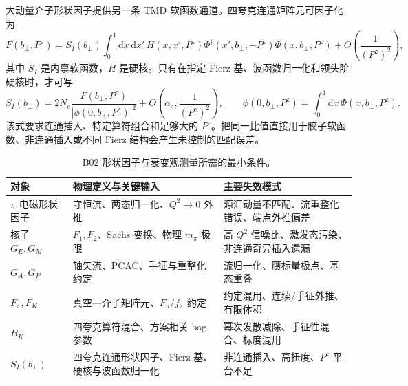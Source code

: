 大动量介子形状因子提供另一条 TMD 软函数通道。四夸克连通矩阵元可因子化为
\begin{equation}
  F(b_\perp,P^z)
  =S_I(b_\perp)
  \int_0^1\!\mathrm dx\,\mathrm dx'\,
  H(x,x',P^z)
  \Phi^\dagger(x',b_\perp,-P^z)
  \Phi(x,b_\perp,P^z)
  +O\!\left(\frac1{(P^z)^2}\right),
  \label{eq:b02-soft-factorization}
\end{equation}
其中 \(S_I\) 是内禀软函数，\(H\) 是硬核。只有在指定 Fierz 基、波函数归一化和领头阶硬核时，才可写
\begin{equation}
  S_I(b_\perp)
  =2N_c\frac{F(b_\perp,P^z)}
  {\left|\phi(0,b_\perp,P^z)\right|^2}
  +O\!\left(\alpha_s,\frac1{(P^z)^2}\right),
  \qquad
  \phi(0,b_\perp,P^z)=\int_0^1\!\mathrm dx\,\Phi(x,b_\perp,P^z).
  \label{eq:b02-soft-lo}
\end{equation}
该式要求连通插入、特定算符组合和足够大的 \(P^z\)。把同一比值直接用于胶子软函数、非连通插入或不同 Fierz 结构会产生未控制的匹配误差。

\begin{table}[htbp]
\centering
\small
\caption{B02 形状因子与衰变观测量所需的最小条件。}
\label{tab:b02-form-factor-conditions}
\begin{tabularx}{\textwidth}{>{\raggedright\arraybackslash}p{2.7cm}>{\raggedright\arraybackslash}X>{\raggedright\arraybackslash}p{3.7cm}}
\toprule
对象 & 物理定义与关键输入 & 主要失效模式 \\
\midrule
\(\pi\) 电磁形状因子 & 守恒流、两态归一化、\(Q^2\to0\) 外推 & 源汇动量不匹配、流重整化错误、端点外推偏差 \\
核子 \(G_E,G_M\) & \(F_1,F_2\)、Sachs 变换、物理 \(m_\pi\) 极限 & 高 \(Q^2\) 信噪比、激发态污染、非连通奇异插入遗漏 \\
\(G_A,G_P\) & 轴矢流、PCAC、手征与重整化约定 & 流归一化、赝标量极点、基态重叠 \\
\(F_\pi,F_K\) & 真空—介子矩阵元、\(F_\pi/f_\pi\) 约定 & 约定混用、连续/手征外推、有限体积 \\
\(B_K\) & 四夸克算符混合、方案相关 bag 参数 & 幂次发散减除、手征性混合、标度混用 \\
\(S_I(b_\perp)\) & 四夸克连通形状因子、Fierz 基、硬核与波函数归一化 & 非连通插入、高扭度、\(P^z\) 平台不足 \\
\bottomrule
\end{tabularx}
\end{table}
